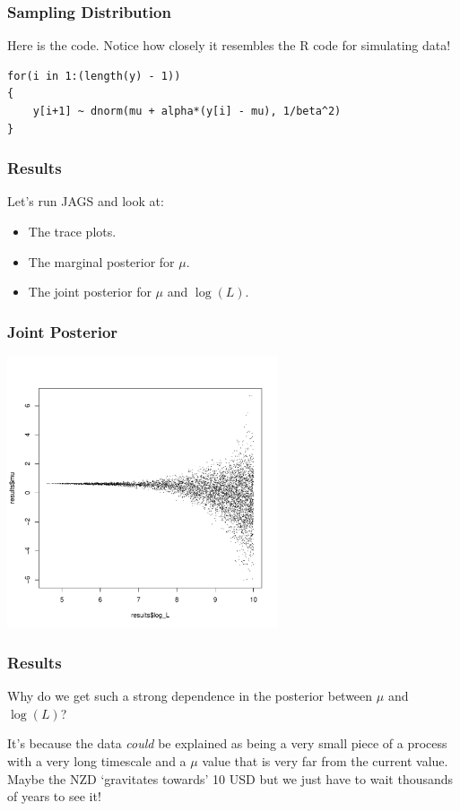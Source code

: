 \documentclass{beamer}
\begin{document}
\begin{frame}[fragile]
\frametitle{Sampling Distribution}
Here is the code. Notice how closely it resembles the R code for simulating
data!

\begin{verbatim}
for(i in 1:(length(y) - 1))
{
    y[i+1] ~ dnorm(mu + alpha*(y[i] - mu), 1/beta^2)
}
\end{verbatim}

\end{frame}

\begin{frame}[fragile]
\frametitle{Results}
Let's run JAGS and look at:

\begin{itemize}
\item The trace plots.\pause
\item The marginal posterior for $\mu$.\pause
\item The joint posterior for $\mu$ and $\log(L)$.
\end{itemize}

\end{frame}



\begin{frame}[fragile]
\frametitle{Joint Posterior}
\begin{center}
\includegraphics[width=0.6\textwidth]{images/nzd_posterior1.pdf}
\end{center}

\end{frame}


\begin{frame}[fragile]
\frametitle{Results}
Why do we get such a strong dependence in the posterior between
$\mu$ and $\log(L)$?\\[0.5em]\pause

It's because the data {\em could} be explained as being a very small piece
of a process with a very long timescale and a $\mu$ value that is very far
from the current value. Maybe the NZD `gravitates towards' 10 USD but we
just have to wait thousands of years to see it!
\end{frame}
\end{document}
